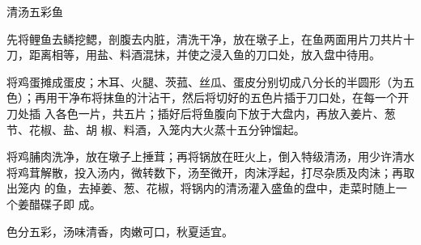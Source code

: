 %
%
%
%
%
%
%
\begin{recipe}[麒麟鱼]{清汤五彩鱼}

\ingredients


\preparation

\step 先将鲤鱼去鳞挖鳃，剖腹去内脏，清洗干净，放在墩子上，在鱼两面用片刀共片十
刀，距离相等，用盐、料酒混抹，并使之浸入鱼的刀口处，放入盘中待用。

\step 将鸡蛋摊成蛋皮；木耳、火腿、茨菰、丝瓜、蛋皮分别切成八分长的半圆形（为五
色）；再用干净布将抹鱼的汁沾干，然后将切好的五色片插于刀口处，在每一个开刀处插
入各色一片，共五片；插好后将鱼腹向下放于大盘内，再放入姜片、葱节、花椒、盐、胡
椒、料酒，入笼内大火蒸十五分钟馏起。

\step 将鸡脯肉洗净，放在墩子上捶茸；再将锅放在旺火上，倒入特级清汤，用少许清水
将鸡茸解散，投入汤内，微转数下，汤至微开，肉沫浮起，打尽杂质及肉沬；再取出笼内
的鱼，去掉姜、葱、花椒，将锅内的清汤灌入盛鱼的盘中，走菜时随上一个姜醋碟子即
成。

\features

色分五彩，汤味清香，肉嫩可口，秋夏适宜。

\end{recipe}

